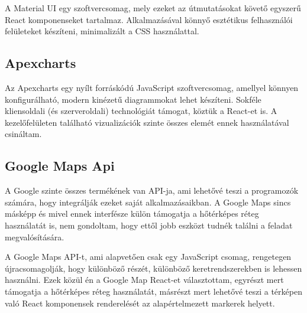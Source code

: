A Material UI\cite{material-ui} egy szoftvercsomag, mely ezeket az útmutatásokat követő egyszerű React komponenseket tartalmaz.
Alkalmazásával könnyő esztétikus felhasználói felületeket készíteni, minimalizált a CSS használattal. 

\subsection{Apexcharts}
Az Apexcharts\cite{apexcharts} egy nyílt forráskódú JavaScript szoftvercsomag, amellyel könnyen konfigurálható, modern kinézetű diagrammokat lehet készíteni.
Sokféle kliensoldali (és szerveroldali) technológiát támogat, köztük a React-et is. A kezelőfelületen található vizualizációk szinte összes elemét ennek használatával csináltam.

\subsection{Google Maps Api}
A Google szinte összes termékének van API-ja, ami lehetővé teszi a programozók számára, hogy integrálják ezeket saját alkalmazásaikban.
A Google Maps sincs másképp és mivel ennek interfésze külön támogatja a hőtérképes réteg használatát is, nem gondoltam, hogy ettől jobb eszközt tudnék találni a feladat megvalósítására.

A Google Maps API-t, ami alapvetően csak egy JavaScript csomag, rengetegen újracsomagolják, hogy különböző részét, különböző keretrendszerekben is lehessen használni.
Ezek közül én a Google Map React\cite{google-map-react}-et választottam, egyrészt mert támogatja a hőtérképes réteg használatát, 
másrészt mert lehetővé teszi a térképen való React komponensek renderelését az alapértelmezett markerek helyett.